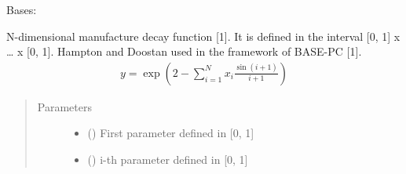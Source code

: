 \documentclass[letterpaper,10pt,english,openany,oneside]{sphinxmanual}
\begin{document}

\begin{fulllineitems}
\label{\detokenize{pygpc.testfunctions:pygpc.testfunctions.testfunctions.ManufactureDecay}}
Bases: {\hyperref[\detokenize{pygpc:pygpc.AbstractModel.AbstractModel}]{}}

N-dimensional manufacture decay function {[}1{]}. It is defined in the interval {[}0, 1{]} x … x {[}0, 1{]}.
Hampton and Doostan used in the framework of BASE-PC {[}1{]}.
\begin{equation*}
\begin{split}y = \exp{\left(2 - \sum_{i=1}^{N} x_i \frac{\sin(i+1)}{i + 1}\right)}\end{split}
\end{equation*}\begin{quote}\begin{description}
\item[{Parameters}] \leavevmode\begin{itemize}
\item {} 
\sphinxstyleliteralstrong{\sphinxupquote{{[}}}\sphinxstyleliteralstrong{\sphinxupquote{{]}}} (\sphinxstyleliteralemphasis{\sphinxupquote{ {[}}}\sphinxstyleliteralemphasis{\sphinxupquote{{]}}}) \textendash{} First parameter defined in {[}0, 1{]}

\item {} 
\sphinxstyleliteralstrong{\sphinxupquote{{[}}}\sphinxstyleliteralstrong{\sphinxupquote{{]}}} (\sphinxstyleliteralemphasis{\sphinxupquote{ {[}}}\sphinxstyleliteralemphasis{\sphinxupquote{{]}}}) \textendash{} i-th parameter defined in {[}0, 1{]}


\end{itemize}
\end{description}
\end{quote}
\end{fulllineitems}
\end{document}
